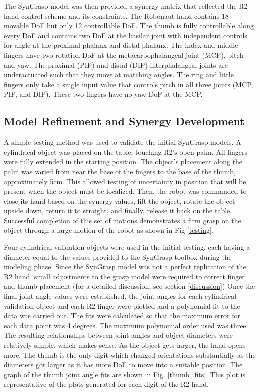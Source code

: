 \documentclass[runningheads,a4paper]{llncs}
\begin{document}
The SynGrasp model was then provided a synergy matrix that reflected the R2 hand control scheme and its constraints. The Robonaut hand contains 18 movable  DoF but only 12 controllable DoF. The thumb is fully controllable along every DoF and contains two DoF at the basilar joint with independent controls for angle at the proximal phalanx and distal phalanx. The index and middle fingers have two rotation  DoF at the metacarpophalangeal joint (MCP), pitch and yaw. The proximal (PIP) and distal (DIP) interphalangeal joints are underactuated such that they move at matching angles. The ring and little fingers only take a single input value that controls pitch in all three joints (MCP, PIP, and DIP). These two fingers have no yaw DoF at the MCP.


\subsection{Model Refinement and Synergy Development} 
A simple testing method was used to validate the initial SynGrasp models. A cylindrical object was placed on the table, touching R2's open palm. All fingers were fully extended in the starting position. The object's placement along the palm was varied from near the base of the fingers to the base of the thumb, approximately 5cm. This allowed testing of uncertainty in position that will be present when the object must be localized. Then, the robot was commanded to close its hand based on the synergy values, lift the object, rotate the object upside down, return it to straight, and finally, release it back on the table. Successful completion of this set of motions demonstrates a firm grasp on the object through a large motion of the robot as shown in Fig \ref{testing}. 

Four cylindrical validation objects were used in the initial testing, each having a diameter equal to the values provided to the SynGrasp toolbox during the modeling phase. Since the SynGrasp model was not a perfect replication of the R2 hand, small adjustments to the grasp model were required to correct finger and thumb placement (for a detailed discussion, see section \ref{discussion}) Once the final joint angle values were established, the joint angles for each cylindrical validation object and each R2 finger were plotted and a polynomial fit to the data was carried out. The fits were calculated so that the maximum error for each data point was 4 degrees.  The maximum polynomial order used was three. The resulting relationships between joint angles and object diameters were relatively simple, which makes sense. As the object gets larger, the hand opens more. The thumb is the only digit which changed orientations substantially as the diameters got larger as it has more DoF to move into a suitable position. The graph of the thumb joint angle fits are shown in Fig. \ref{thumb_fits}. This plot is representative of the plots generated for each digit of the R2 hand.
\end{document}
